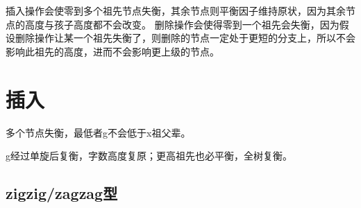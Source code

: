 \documentclass{article}
\begin{document}
插入操作会使零到多个祖先节点失衡，其余节点则平衡因子维持原状，因为其余节点的高度与孩子高度都不会改变。
删除操作会使得零到一个祖先会失衡，因为假设删除操作让某一个祖先失衡了，则删除的节点一定处于更短的分支上，所以不会影响此祖先的高度，进而不会影响更上级的节点。

\section{插入}

多个节点失衡，最低者g不会低于x祖父辈。

g经过单旋后复衡，字数高度复原；更高祖先也必平衡，全树复衡。

\subsection{zigzig/zagzag型}
\begin{figure}[htb]
  \centering
  \quad
  \quad
  \label{insert_rotate}
\end{figure}
\end{document}
